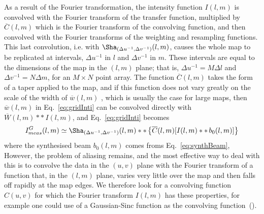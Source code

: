 As a result of the Fourier transformation, the intensity function $I(l,m)$ is convolved with the Fourier transform of the transfer function, multiplied by $\overline{C}(l,m)$ which is the Fourier transform of the convolving function, and then convolved with the Fourier transforms of the weighting and resampling functions. This last convolution, i.e. with $\Sha_{(\Delta{u}^{-1},\Delta{v}^{-1})}(l,m)$, causes the whole map to be replicated at intervals, $\Delta{u}^{-1}$ in $l$ and $\Delta{v}^{-1}$ in $m$. These intervals are equal to the dimensions of the map in the $(l, m )$ plane; that is, $\Delta{u}^{-1} = M\Delta{l}$ and $\Delta{v}^{-1} = N\Delta{m}$, for an $M \times N$ point array. The function $\overline{C}(l,m)$ takes the form of a taper applied to the map, and if this function does not vary greatly on the scale of the width of ${\overline{w}(l,m)}$ , which is usually the case for large maps, then ${\overline{w}(l,m)}$ in Eq.~\ref{eq:gridInti} can be convolved directly with
$\overline{W}(l,m)\ast{\ast}{\,}{I(l,m)}$, and Eq.~\ref{eq:gridInti} becomes
\begin{equation}
\label{eq:gridIntiApprox}
I^{G}_{meas}(l,m) \simeq \Sha_{(\Delta{u}^{-1},\Delta{v}^{-1})}(l,m)\ast{\ast}\,{\left\lbrace{\overline{C}(l,m)[{I(l,m)}\ast{\ast}{\,}b_0(l,m)]}\right\rbrace }
\end{equation}
where the synthesised beam $b_0(l,m )$ comes froms Eq.~\ref{eq:synthBeam},
However, the problem of aliasing remains, and the most effective way to deal with this is to convolve the data in the $(u ,v)$ plane with the Fourier transform of a function that, in the $(l,m)$ plane, varies very little over the map and then falls off rapidly at the map edges. We therefore look for a convolving function $C(u,v)$ for which the Fourier transform $I(l, m)$ has these properties, for example one could use of a Gaussian-Sinc function as the convolving function~({\citet[see][Sec.~10.2~Pgs. 394-399]{thompson2008interferometry}}).
